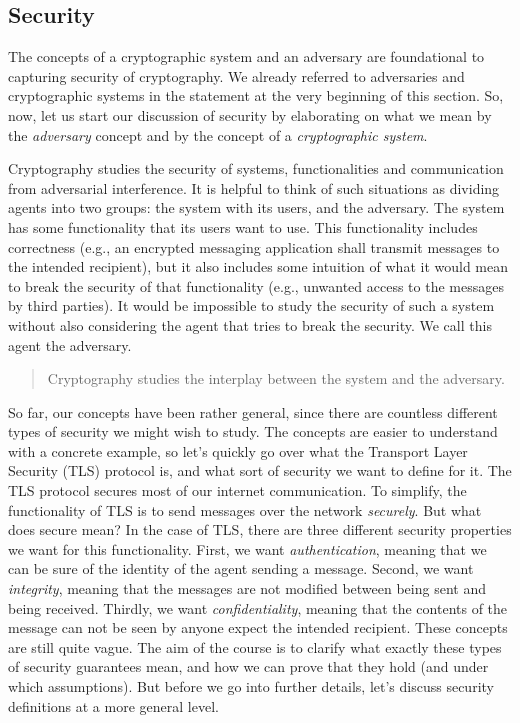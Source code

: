 \subsection{Security}\label{ssec:security-foundations}
The concepts of a cryptographic system and an adversary are foundational to capturing security of cryptography. We already referred to adversaries and cryptographic systems in the statement at the very beginning of this section. So, now, let us start our discussion of security by elaborating on what we mean by the \emph{adversary} concept and by the concept of a \emph{cryptographic system}.

Cryptography studies the security of systems, functionalities and communication from adversarial interference. It is helpful to think of such situations as dividing agents into two groups: the system with its users, and the adversary. The system has some functionality that its users want to use. This functionality includes correctness (e.g., an encrypted messaging application shall transmit messages to the intended recipient), but it also includes some intuition of what it would mean to break the security of that functionality (e.g., unwanted access to the messages by third parties). It would be impossible to study the security of such a system without also considering the agent that tries to break the security. We call this agent the adversary. 
\begin{quote}
Cryptography studies the interplay between the system and the adversary.
\end{quote}


So far, our concepts have been rather general, since there are countless different types of security we might wish to study. The concepts are easier to understand with a concrete example, so let's quickly go over what the Transport Layer Security (TLS) protocol is, and what sort of security we want to define for it. The TLS protocol secures most of our internet communication. To simplify, the functionality of TLS is to send messages over the network \emph{securely}. But what does secure mean? In the case of TLS, there are three different security properties we want for this functionality. First, we want \emph{authentication}, meaning that we can be sure of the identity of the agent sending a message. Second, we want \emph{integrity}, meaning that the messages are not modified between being sent and being received. Thirdly, we want \emph{confidentiality}, meaning that the contents of the message can not be seen by anyone expect the intended recipient. These concepts are still quite vague. The aim of the course is to clarify what exactly these types of security guarantees mean, and how we can prove that they hold (and under which assumptions). But before we go into further details, let's discuss security definitions at a more general level.

